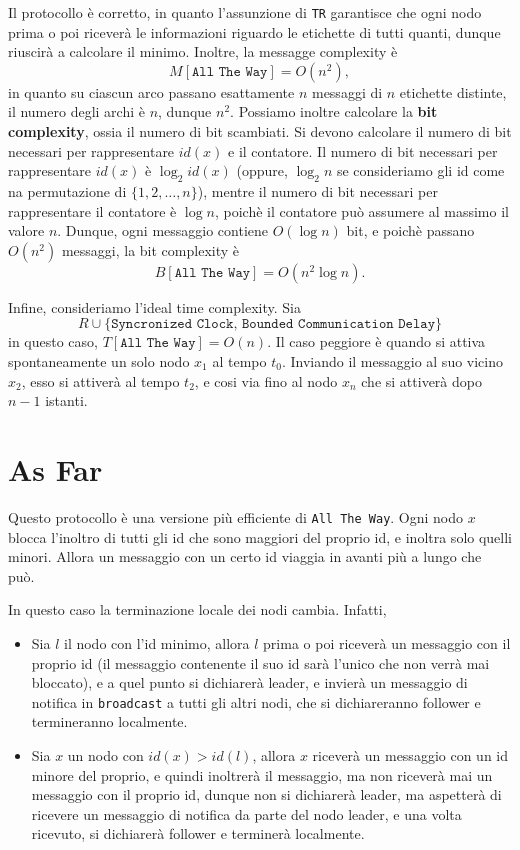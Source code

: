 Il protocollo è corretto, in quanto l'assunzione di \texttt{TR} garantisce che ogni nodo prima o poi riceverà le informazioni riguardo le etichette di tutti quanti, dunque riuscirà a calcolare il minimo. Inoltre, la messagge complexity è
\[
    M[\texttt{All The Way}] = O(n^2),
\]
in quanto su ciascun arco passano esattamente $n$ messaggi di $n$ etichette distinte, il numero degli archi è $n$, dunque $n^2$. Possiamo inoltre calcolare la \textbf{bit complexity}, ossia il numero di bit scambiati. Si devono calcolare il numero di bit necessari per rappresentare $id(x)$ e il contatore. Il numero di bit necessari per rappresentare $id(x)$ è $\log_2 id(x)$ (oppure, $\log_2 n$ se consideriamo gli id come na permutazione di $\{1, 2, \ldots, n\}$), mentre il numero di bit necessari per rappresentare il contatore è $\log n$, poichè il contatore può assumere al massimo il valore $n$. Dunque, ogni messaggio contiene $O(\log n)$ bit, e poichè passano $O(n^2)$ messaggi, la bit complexity è
\[
    B[\texttt{All The Way}] = O(n^2 \log n).
\]

Infine, consideriamo l'ideal time complexity. Sia 
\[
    R \cup \{\texttt{Syncronized Clock, Bounded Communication Delay}\}
\]
in questo caso, $T[\texttt{All The Way}] = O(n)$. Il caso peggiore è quando si attiva spontaneamente un solo nodo $x_1$ al tempo $t_0$. Inviando il messaggio al suo vicino $x_2$, esso si attiverà al tempo $t_2$, e cosi via fino al nodo $x_n$ che si attiverà dopo $n-1$ istanti.

\section{As Far}

Questo protocollo è una versione più efficiente di \texttt{All The Way}. Ogni nodo $x$ blocca l'inoltro di tutti gli id che sono maggiori del proprio id, e inoltra solo quelli minori. Allora un messaggio con un certo id viaggia in avanti più a lungo che può.

In questo caso la terminazione locale dei nodi cambia. Infatti,
\begin{itemize}
    \item Sia $l$ il nodo con l'id minimo, allora $l$ prima o poi riceverà un messaggio con il proprio id (il messaggio contenente il suo id sarà l'unico che non verrà mai bloccato), e a quel punto si dichiarerà leader, e invierà un messaggio di notifica in \texttt{broadcast} a tutti gli altri nodi, che si dichiareranno follower e termineranno localmente.
    \item Sia $x$ un nodo con $id(x) > id(l)$, allora $x$ riceverà un messaggio con un id minore del proprio, e quindi inoltrerà il messaggio, ma non riceverà mai un messaggio con il proprio id, dunque non si dichiarerà leader, ma aspetterà di ricevere un messaggio di notifica da parte del nodo leader, e una volta ricevuto, si dichiarerà follower e terminerà localmente.
\end{itemize}

